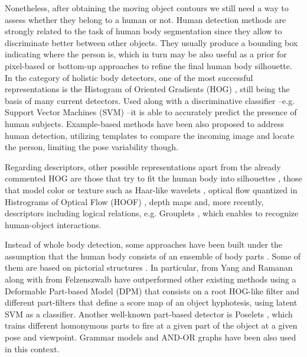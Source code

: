 \documentclass[10pt,twocolumn,letterpaper]{article}
\begin{document}
Nonetheless, after obtaining the moving object contours we still need a way to assess whether they belong to a human or not. Human detection methods are strongly related to the task of human body segmentation since they allow to discriminate better between other objects. They usually produce a bounding box indicating where the person is, which in turn may be also useful as a prior for pixel-based or bottom-up approaches to refine the final human body silhouette. In the category of holistic body detectors, one of the most successful representations is the Histogram of Oriented Gradients (HOG) \cite{dalal2005histograms}, still being the basis of many current detectors. Used along with a discriminative classifier --e.g. Support Vector Machines (SVM) \cite{hearst1998support} --it is able to accurately predict the presence of human subjects. Example-based methods \cite{andriluka2010monocular} have been also proposed to address human detection, utilizing templates to compare the incoming image and locate the person, limiting the pose variability though.  

Regarding descriptors, other possible representations apart from the already commented HOG are those that try to fit the human body into silhouettes \cite{mittal2003human}, those that model color or texture such as Haar-like wavelets \cite{viola2005detecting}, optical flow quantized in Histrograms of Optical Flow (HOOF) \cite{dalal2006human}, depth maps \cite{plagemann2010real} and, more recently, descriptors including logical relations, e.g. Grouplets \cite{yao2010grouplet}, which enables to recognize human-object interactions.

Instead of whole body detection, some approaches have been built under the assumption that the human body consists of an ensemble of body parts \cite{ramanan2006learning, pirsiavash2012steerable}. Some of them are based on pictorial structures \cite{andriluka2009pictorial, yang2011articulated}. In particular, \cite{yang2011articulated, yang2012articulated} from Yang and Ramanan along with \cite{felzenszwalb2010object} from Felzenszwalb have outperformed other existing methods using a Deformable Part-based Model (DPM) that consists on a root HOG-like filter and different part-filters that define a score map of an object hyphotesis, using latent SVM as a classifier. Another well-known part-based detector is Poselets \cite{bourdev2009poselets, wang2011learning}, which trains different homonymous parts to fire at a given part of the object at a given pose and viewpoint. Grammar models \cite{girshick2011object} and AND-OR graphs \cite{zhu2008max} have been also used in this context.
\end{document}
